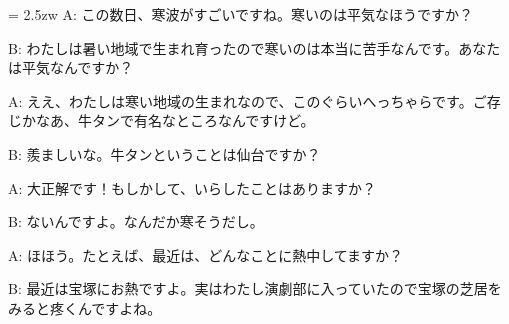 \documentclass[11pt]{amsart}
\title{}
\author{}
\newenvironment{hangall}[1]{\hangindent = 2.5zw\everypar{\hangindent = 2.5zw}}{}
\begin{document}
\maketitle
\begin{hangall}{}%
A: この数日、寒波がすごいですね。寒いのは平気なほうですか？



B: わたしは暑い地域で生まれ育ったので寒いのは本当に苦手なんです。あなたは平気なんですか？



A: ええ、わたしは寒い地域の生まれなので、このぐらいへっちゃらです。ご存じかなあ、牛タンで有名なところなんですけど。



B: 羨ましいな。牛タンということは仙台ですか？



A: 大正解です！もしかして、いらしたことはありますか？



B: ないんですよ。なんだか寒そうだし。



A: ほほう。たとえば、最近は、どんなことに熱中してますか？



B: 最近は宝塚にお熱ですよ。実はわたし演劇部に入っていたので宝塚の芝居をみると疼くんですよね。\end{hangall}
\end{document}
